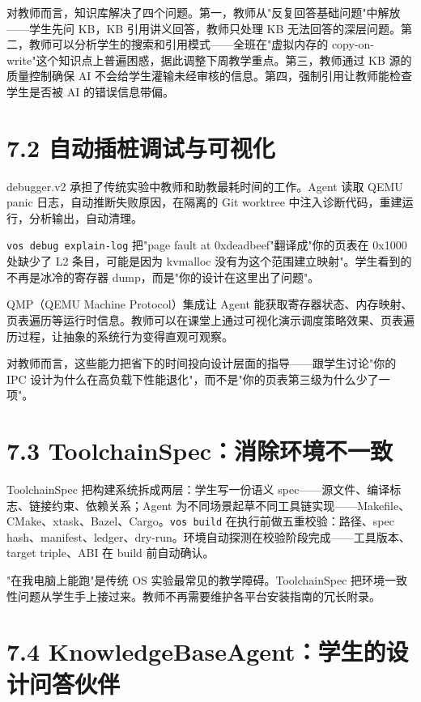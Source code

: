 \documentclass[UTF8,a4paper,12pt,openany]{ctexrep}
\newcommand{\passthrough}[1]{#1}
\begin{document}
对教师而言，知识库解决了四个问题。第一，教师从"反复回答基础问题"中解放------学生先问 KB，KB 引用讲义回答，教师只处理 KB 无法回答的深层问题。第二，教师可以分析学生的搜索和引用模式------全班在"虚拟内存的 copy-on-write"这个知识点上普遍困惑，据此调整下周教学重点。第三，教师通过 KB 源的质量控制确保 AI 不会给学生灌输未经审核的信息。第四，强制引用让教师能检查学生是否被 AI 的错误信息带偏。

\section{7.2 自动插桩调试与可视化}\label{72-ux81eaux52a8ux63d2ux6869ux8c03ux8bd5ux4e0eux53efux89c6ux5316}

debugger.v2 承担了传统实验中教师和助教最耗时间的工作。Agent 读取 QEMU panic 日志，自动推断失败原因，在隔离的 Git worktree 中注入诊断代码，重建运行，分析输出，自动清理。

\passthrough{\lstinline!vos debug explain-log!} 把"page fault at 0xdeadbeef"翻译成"你的页表在 0x1000 处缺少了 L2 条目，可能是因为 kvmalloc 没有为这个范围建立映射"。学生看到的不再是冰冷的寄存器 dump，而是"你的设计在这里出了问题"。

QMP（QEMU Machine Protocol）集成让 Agent 能获取寄存器状态、内存映射、页表遍历等运行时信息。教师可以在课堂上通过可视化演示调度策略效果、页表遍历过程，让抽象的系统行为变得直观可观察。

对教师而言，这些能力把省下的时间投向设计层面的指导------跟学生讨论"你的 IPC 设计为什么在高负载下性能退化"，而不是"你的页表第三级为什么少了一项"。

\section{7.3 ToolchainSpec：消除环境不一致}\label{73-toolchainspecux6d88ux9664ux73afux5883ux4e0dux4e00ux81f4}

ToolchainSpec 把构建系统拆成两层：学生写一份语义 spec------源文件、编译标志、链接约束、依赖关系；Agent 为不同场景起草不同工具链实现------Makefile、CMake、xtask、Bazel、Cargo。\passthrough{\lstinline!vos build!} 在执行前做五重校验：路径、spec hash、manifest、ledger、dry-run。环境自动探测在校验阶段完成------工具版本、target triple、ABI 在 build 前自动确认。

"在我电脑上能跑"是传统 OS 实验最常见的教学障碍。ToolchainSpec 把环境一致性问题从学生手上接过来。教师不再需要维护各平台安装指南的冗长附录。

\section{7.4 KnowledgeBaseAgent：学生的设计问答伙伴}\label{74-knowledgebaseagentux5b66ux751fux7684ux8bbeux8ba1ux95eeux7b54ux4f19ux4f34}
\end{document}
